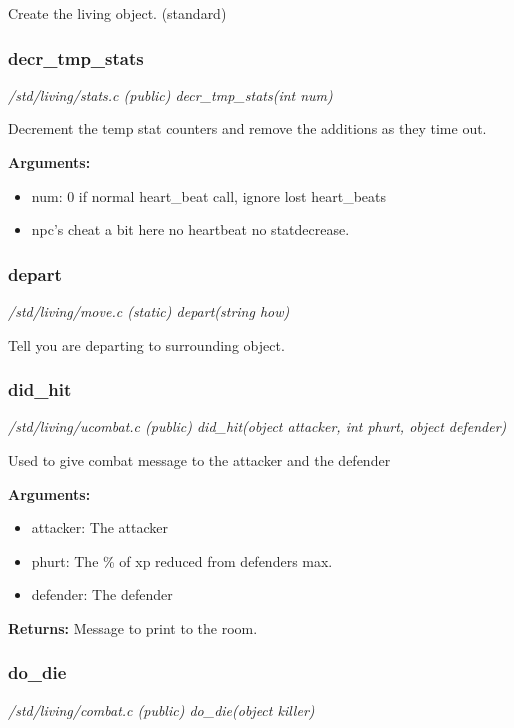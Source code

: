 Create the living object. (standard)


\subsubsection{decr\_tmp\_stats}

{\em /std/living/stats.c (public) decr\_tmp\_stats(int num)}

Decrement the temp stat counters and remove 
the additions as they time out.

{\bf Arguments:}
\begin{itemize}
\item      num: 0 if normal heart\_beat call, ignore lost heart\_beats
\item npc's cheat a bit here no heartbeat no statdecrease.
\end{itemize}


\subsubsection{depart}

{\em /std/living/move.c (static) depart(string how)}

Tell you are departing to surrounding object.


\subsubsection{did\_hit}

{\em /std/living/ucombat.c (public) did\_hit(object attacker, int phurt, object defender)}

Used to give combat message to the attacker and the defender

{\bf Arguments:}
\begin{itemize}
\item     attacker: The attacker
\item phurt:    The \% of xp reduced from defenders max.
\item defender: The defender
\end{itemize}

{\bf Returns:}        Message to print to the room.


\subsubsection{do\_die}

{\em /std/living/combat.c (public) do\_die(object killer)}

